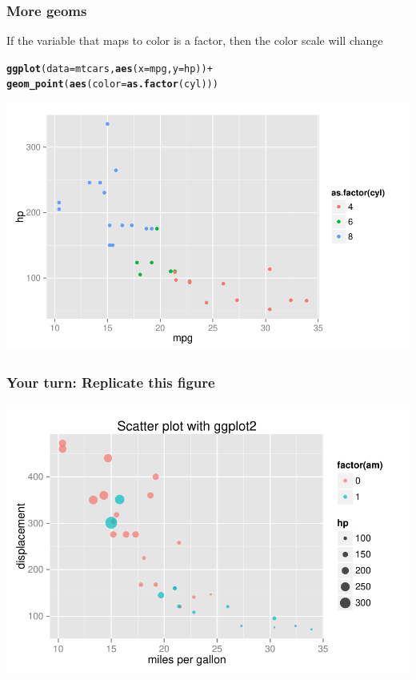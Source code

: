 \documentclass[12pt]{beamer}\usepackage[]{graphicx}\usepackage[]{color}
\makeatletter
\newcommand{\hlopt}[1]{\textcolor[rgb]{0,0,0}{#1}}%
\newcommand{\hlstd}[1]{\textcolor[rgb]{0.345,0.345,0.345}{#1}}%
\newcommand{\hlkwc}[1]{\textcolor[rgb]{0.333,0.667,0.333}{#1}}%
\newcommand{\hlkwd}[1]{\textcolor[rgb]{0.737,0.353,0.396}{\textbf{#1}}}%
\newenvironment{kframe}{%
 \def\at@end@of@kframe{}%
 \ifinner\ifhmode%
  \def\at@end@of@kframe{\end{minipage}}%
  \begin{minipage}{\columnwidth}%
 \fi\fi%
 \def\FrameCommand##1{\hskip\@totalleftmargin \hskip-\fboxsep
 \colorbox{shadecolor}{##1}\hskip-\fboxsep
     \hskip-\linewidth \hskip-\@totalleftmargin \hskip\columnwidth}%
 \MakeFramed {\advance\hsize-\width
   \@totalleftmargin\z@ \linewidth\hsize
   \@setminipage}}%
 {\par\unskip\endMakeFramed%
 \at@end@of@kframe}
\newenvironment{knitrout}{}{} %
\makeatother
\begin{document}
\begin{frame}[fragile]
\frametitle{More geoms}
If the variable that maps to color is a factor, then the color scale will change
\begin{knitrout}\scriptsize
{}\color{fgcolor}\begin{kframe}
\begin{alltt}
\hlkwd{ggplot}\hlstd{(}\hlkwc{data} \hlstd{= mtcars,} \hlkwd{aes}\hlstd{(}\hlkwc{x} \hlstd{= mpg,} \hlkwc{y} \hlstd{= hp))} \hlopt{+}
  \hlkwd{geom_point}\hlstd{(}\hlkwd{aes}\hlstd{(}\hlkwc{color} \hlstd{=} \hlkwd{as.factor}\hlstd{(cyl)))}
\end{alltt}
\end{kframe}

{\centering \includegraphics[width=.75\linewidth,height=.5\linewidth]{figure/xyplot_mtcars12-1} 

}



\end{knitrout}

\end{frame}


\begin{frame}[fragile]
\frametitle{Your turn: Replicate this figure}
\begin{knitrout}\scriptsize
{}\color{fgcolor}

{\centering \includegraphics[width=.85\linewidth,height=.6\linewidth]{figure/your_xyplot2-1} 

}



\end{knitrout}
\end{frame}
\end{document}
